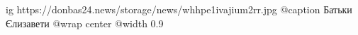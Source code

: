  
 
 
 
 

\ifcmt
  ig https://donbas24.news/storage/news/whhpe1ivajium2rr.jpg
	@caption Батьки Єлизавети
  @wrap center
  @width 0.9
\fi

